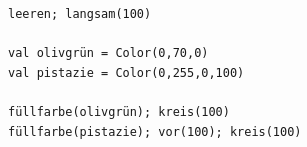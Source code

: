   

\begin{lstlisting}[basicstyle={\ttfamily\fontsize{16}{19}\selectfont},numbers=none]
leeren; langsam(100)      

val olivgrün = Color(0,70,0)
val pistazie = Color(0,255,0,100)

füllfarbe(olivgrün); kreis(100)
füllfarbe(pistazie); vor(100); kreis(100)
\end{lstlisting}
        
